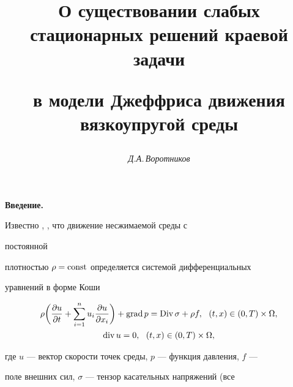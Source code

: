 




\author{\it Д.А.\,Воротников}




\title{О существовании слабых стационарных решений краевой задачи


в модели Джеффриса движения вязкоупругой среды}





\date{}




\pagestyle{plain} %







\maketitle


\label{begin}





\setcounter{section}{0}





{\bf Введение.}


Известно \cite{dya}, \cite{lit}, что движение несжимаемой среды с


постоянной


плотностью $\rho = \operatorname{const}$ определяется системой дифференциальных


уравнений в форме Коши


\begin{gather}


\rho\bigg(\frac{\partial u}{\partial t}+\sum_{i=1}^{n} u_i


\frac{\partial u}{\partial x_i}\bigg)+\grad p


=\Div \sigma+\rho f,\ \ (t,x)\in(0,T)\times\Omega,\\


\dv u=0,\ \ (t,x)\in(0,T)\times\Omega,


\end{gather}


где $u$ --- вектор скорости точек среды, $p$ --- функция давления, $f$ ---


поле внешних сил, $\sigma$ --- тензор касательных напряжений (все


